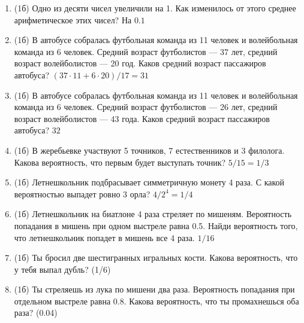 \documentclass[a4paper, 12pt]{article}
\begin{document}
\begin{enumerate}
\item (1б) Одно из десяти чисел увеличили на 1. Как изменилось от этого среднее арифметическое этих чисел? На $0.1$
\item (1б) В автобусе собралась футбольная команда из 11 человек и волейбольная команда из 6 человек. Средний возраст футболистов — 37 лет, средний возраст волейболистов — 20 год. Каков средний возраст пассажиров автобуса? $(37 \cdot 11 + 6 \cdot 20)/17=31$
\item (1б) В автобусе собралась футбольная команда из 11 человек и волейбольная команда из 6 человек. Средний возраст футболистов — 26 лет, средний возраст волейболистов — 43 года. Каков средний возраст пассажиров автобуса? $32$
\item (1б) В жеребьевке участвуют 5 точников, 7 естественников и 3 филолога.
Какова вероятность, что первым будет выступать точник? $5/15=1/3$
\item (1б) Летнешкольник подбрасывает симметричную монету 4 раза.
С какой вероятностью выпадет ровно 3 орла? $4/2^4=1/4$
\item (1б) Летнешкольник на биатлоне 4 раза стреляет по мишеням.
Вероятность попадания в мишень при одном выстреле равна 0.5.
Найди вероятность того, что летнешкольник попадет в мишень все 4 раза. $1/16$
\item (1б) Ты бросил две шестигранных игральных кости. Какова вероятность, что у тебя выпал дубль?
(1/6)
\item (1б) Ты стреляешь из лука по мишени два раза. Вероятность попадания при отдельном выстреле равна 0.8.
Какова вероятность, что ты промахнешься оба раза? (0.04)
\end{enumerate}
\end{document}
